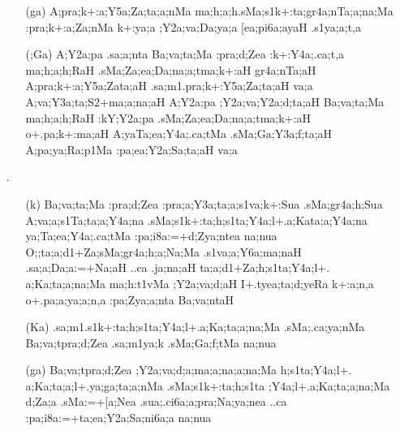 \begin{itemize}
\begin{itemize}
          \item[({\sktf ga})] {\sktf A;pra;k+:a;Y5a;Za;ta;a;nMa
ma;h;a;h}{\sktf .sMa;s1k+:ta;gr4a;nTa;a;na;Ma
:pra;k+:a;Za;nMa k+:ya;a ;Y2a;va;Da;ya;a [ea;pi6a;a{yaH} .s1ya;a;t,a }
          
          \item[({\sktf ;Ga})] {\sktf A;Y2a;pa .sa;a;nta
Ba;va;ta;Ma :pra;d;Zea :k+:Y4a;.ca;t,a ma;h;a;h;RaH
.sMa;Za;ea;Da;na;a;tma;k+:aH gr4a{;nTa;aH} A;pra;k+:a{;Y5a;Za}{ta;aH} .sa;m1.pra;k+:Y5a;Za;ta;aH va;a
A;va;Y3a;ta;S2+ma;a;na;aH A;Y2a;pa ;Y2a;va;Y2a;d;ta;aH
Ba;va;ta;Ma ma;h;a;h;RaH :kY;Y2a;pa
.sMa;Za;ea;Da;na;a;tma;k+:aH o+.pa;k+:ma;aH A;yaTa;ea;Y4a;.ca;tMa .sMa;Ga;Y3a;f;ta;aH\ZF{,} A;pa;ya;Ra;p1Ma
:pa;ea;Y2a;Sa;ta;aH va;a}
          \end{itemize}

\item[{\sktf 25}.] \begin{itemize}
               
               \item[({\sktf k})] {\sktf Ba;va;ta;Ma :pra;d;Zea
:pra;a;Y3a;ta;a;s1va;k+:Sua
.sMa;gr4a;h;Sua A;va;a;s1Ta;ta;a;Y4a;na} {\sktf
.sMa;s1k+:ta;h;s1ta\ZF{-};Y4a;l+.a;Kata;a;Y4a;na ya;Ta;ea;Y4a;.ca;tMa :pa;i8a:=+d;Zya;ntea
na;nua O;;ta;a;d1+Za;sMa;gr4a;h;a;Na;Ma .s1va;a;Y6a;ma;naH
.sa;a;Da;a:=+Na;aH ..ca .ja;na;aH ta;a;d1+Za;h;s1ta;Y4a;l+.%
a;Ka;ta;a;na;Ma ma;h:t1vMa ;Y2a;va;d;aH\ZF{,}
I+.tyea;ta;d;yeRa k+:a;n,a o+.pa;a;ya;a;n,a :pa;Zya;a;nta
Ba;va;ntaH}
               
               \item[({\sktf Ka})] {\sktf .sa;m1.s1k+:ta;h;s1ta;Y4a;l+.a;Ka;ta;a;na;Ma .sMa;.ca;ya;nMa
Ba;va;tpra;d;Zea .sa;m1ya;k .sMa;Ga;f;tMa na;nua}
               
               \item[({\sktf ga})] {\sktf Ba;va;tpra;d;Zea
;Y2a;va;d;a;ma;a;na;a;na;Ma h;s1ta;Y4a;l+.%
a;Ka;ta;a;l+.ya;ga;ta;a;nMa .sMa;s1k+:ta;h;s1ta%
\ZF{-};Y4a;l+.a;Ka;ta;a;na;Ma {d};Za;a .sMa:=+[a;Nea .sua;.ci6a;a;pra;Na;ya;nea ..ca
:pa;i8a:=+ta;ea;Y2a;Sa;ni6a;a na;nua } 
               

\end{itemize}
\end{itemize}
